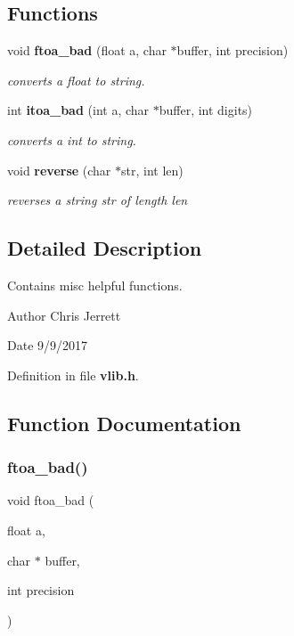 \subsection*{Functions}
\begin{DoxyCompactItemize}
\item 
void \textbf{ ftoa\+\_\+bad} (float a, char $\ast$buffer, int precision)
\begin{DoxyCompactList}\small\item\em converts a float to string. \end{DoxyCompactList}\item 
int \textbf{ itoa\+\_\+bad} (int a, char $\ast$buffer, int digits)
\begin{DoxyCompactList}\small\item\em converts a int to string. \end{DoxyCompactList}\item 
void \textbf{ reverse} (char $\ast$str, int len)
\begin{DoxyCompactList}\small\item\em reverses a string \textquotesingle{}str\textquotesingle{} of length \textquotesingle{}len\textquotesingle{} \end{DoxyCompactList}\end{DoxyCompactItemize}


\subsection{Detailed Description}
Contains misc helpful functions. 

\begin{DoxyAuthor}{Author}
Chris Jerrett 
\end{DoxyAuthor}
\begin{DoxyDate}{Date}
9/9/2017 
\end{DoxyDate}


Definition in file \textbf{ vlib.\+h}.



\subsection{Function Documentation}
\mbox{\label{vlib_8h_a8805990ed667939e615e4a98950b8bd1}} 
\subsubsection{ftoa\+\_\+bad()}
{\footnotesize\ttfamily void ftoa\+\_\+bad (\begin{DoxyParamCaption}\item[{float}]{a,  }\item[{char $\ast$}]{buffer,  }\item[{int}]{precision }\end{DoxyParamCaption})}



